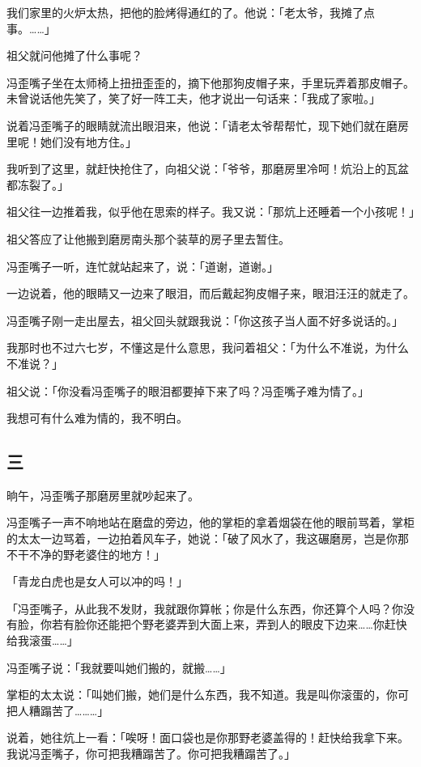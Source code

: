 \documentclass[UTF8]{ctexart}
\begin{document}
我们家里的火炉太热，把他的脸烤得通红的了。他说：「老太爷，我摊了点事。……」

祖父就问他摊了什么事呢？

冯歪嘴子坐在太师椅上扭扭歪歪的，摘下他那狗皮帽子来，手里玩弄着那皮帽子。未曾说话他先笑了，笑了好一阵工夫，他才说出一句话来：「我成了家啦。」

说着冯歪嘴子的眼睛就流出眼泪来，他说：「请老太爷帮帮忙，现下她们就在磨房里呢！她们没有地方住。」

我听到了这里，就赶快抢住了，向祖父说：「爷爷，那磨房里冷呵！炕沿上的瓦盆都冻裂了。」

祖父往一边推着我，似乎他在思索的样子。我又说：「那炕上还睡着一个小孩呢！」

祖父答应了让他搬到磨房南头那个装草的房子里去暂住。

冯歪嘴子一听，连忙就站起来了，说：「道谢，道谢。」

一边说着，他的眼睛又一边来了眼泪，而后戴起狗皮帽子来，眼泪汪汪的就走了。

冯歪嘴子刚一走出屋去，祖父回头就跟我说：「你这孩子当人面不好多说话的。」

我那时也不过六七岁，不懂这是什么意思，我问着祖父：「为什么不准说，为什么不准说？」

祖父说：「你没看冯歪嘴子的眼泪都要掉下来了吗？冯歪嘴子难为情了。」

我想可有什么难为情的，我不明白。

\subsection{三}

晌午，冯歪嘴子那磨房里就吵起来了。

冯歪嘴子一声不响地站在磨盘的旁边，他的掌柜的拿着烟袋在他的眼前骂着，掌柜的太太一边骂着，一边拍着风车子，她说：「破了风水了，我这碾磨房，岂是你那不干不净的野老婆住的地方！」

「青龙白虎也是女人可以冲的吗！」

「冯歪嘴子，从此我不发财，我就跟你算帐；你是什么东西，你还算个人吗？你没有脸，你若有脸你还能把个野老婆弄到大面上来，弄到人的眼皮下边来……你赶快给我滚蛋……」

冯歪嘴子说：「我就要叫她们搬的，就搬……」

掌柜的太太说：「叫她们搬，她们是什么东西，我不知道。我是叫你滚蛋的，你可把人糟蹋苦了………」

说着，她往炕上一看：「唉呀！面口袋也是你那野老婆盖得的！赶快给我拿下来。我说冯歪嘴子，你可把我糟蹋苦了。你可把我糟蹋苦了。」
\end{document}
